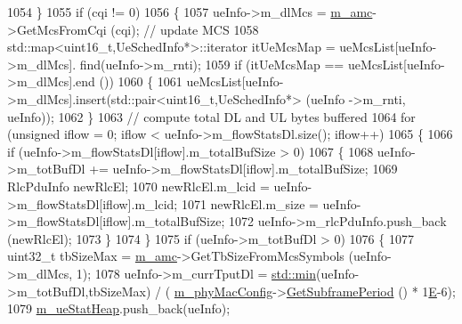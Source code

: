 \begin{DoxyCode}
1054                 \}
1055                 \textcolor{keywordflow}{if} (cqi != 0)
1056                 \{
1057                         ueInfo->m\_dlMcs = \hyperlink{classns3_1_1MmWaveFlexTtiMaxRateMacScheduler_a8a84d69426586fddd45abe7174da607d}{m\_amc}->GetMcsFromCqi (cqi);  \textcolor{comment}{// update MCS}
1058                         std::map<uint16\_t,UeSchedInfo*>::iterator itUeMcsMap = ueMcsList[ueInfo->m\_dlMcs].
      find(ueInfo->m\_rnti);
1059                         \textcolor{keywordflow}{if} (itUeMcsMap == ueMcsList[ueInfo->m\_dlMcs].end ())
1060                         \{
1061                                 ueMcsList[ueInfo->m\_dlMcs].insert(std::pair<uint16\_t,UeSchedInfo*> (ueInfo
      ->m\_rnti, ueInfo));
1062                         \}
1063                         \textcolor{comment}{// compute total DL and UL bytes buffered}
1064                         \textcolor{keywordflow}{for} (\textcolor{keywordtype}{unsigned} iflow = 0; iflow < ueInfo->m\_flowStatsDl.size(); iflow++)
1065                         \{
1066                                 \textcolor{keywordflow}{if} (ueInfo->m\_flowStatsDl[iflow].m\_totalBufSize > 0)
1067                                 \{
1068                                         ueInfo->m\_totBufDl += ueInfo->m\_flowStatsDl[iflow].m\_totalBufSize;
1069                                         RlcPduInfo newRlcEl;
1070                                         newRlcEl.m\_lcid = ueInfo->m\_flowStatsDl[iflow].m\_lcid;
1071                                         newRlcEl.m\_size = ueInfo->m\_flowStatsDl[iflow].m\_totalBufSize;
1072                                         ueInfo->m\_rlcPduInfo.push\_back (newRlcEl);
1073                                 \}
1074                         \}
1075                         \textcolor{keywordflow}{if} (ueInfo->m\_totBufDl > 0)
1076                         \{
1077                                 uint32\_t tbSizeMax = \hyperlink{classns3_1_1MmWaveFlexTtiMaxRateMacScheduler_a8a84d69426586fddd45abe7174da607d}{m\_amc}->GetTbSizeFromMcsSymbols (ueInfo->m\_dlMcs, 
      1);
1078                                 ueInfo->m\_currTputDl = \hyperlink{80211b_8c_ac6afabdc09a49a433ee19d8a9486056d}{std::min}(ueInfo->m\_totBufDl,tbSizeMax) / (
      \hyperlink{classns3_1_1MmWaveMacScheduler_a24d7af4971d2e500fe543cefbafa2fd9}{m\_phyMacConfig}->\hyperlink{classns3_1_1MmWavePhyMacCommon_a1d402260d29c8931dd3dde73b295e23d}{GetSubframePeriod} () * 1\hyperlink{packet-test-suite_8cc_a171669980e29849aa5e3722d573181ee}{E}-6);
1079                                 \hyperlink{classns3_1_1MmWaveFlexTtiMaxRateMacScheduler_aa87c4d83cfc37af1f40280bc303594d6}{m\_ueStatHeap}.push\_back(ueInfo);

\end{DoxyCode}
